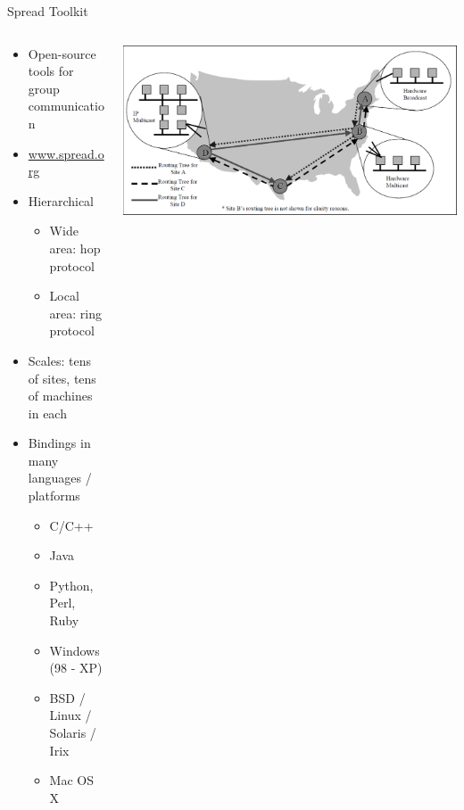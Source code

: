 \documentclass[pdftex]{beamer}
\begin{document}
\begin{frame}{Spread Toolkit}
\begin{columns}
\begin{column}{.5\textwidth}

\begin{itemize}
	\item Open-source tools for group communication
	\item \url{www.spread.org}
	\item Hierarchical
	\begin{itemize}
		\item Wide area: hop protocol
		\item Local area: ring protocol
	\end{itemize}
	\item Scales: tens of sites, tens of machines in each
	\item Bindings in many languages / platforms
	\begin{itemize}
		\item C/C++
		\item Java
		\item Python, Perl, Ruby
		\item Windows (98 - XP)
		\item BSD / Linux / Solaris / Irix
		\item Mac OS X
	\end{itemize}
	
\end{itemize}
\end{column}
	
\begin{column}{.5\textwidth}
\includegraphics[width=\textwidth]{spread_wan}
\end{column}

\end{columns}
\end{frame}
\end{document}
